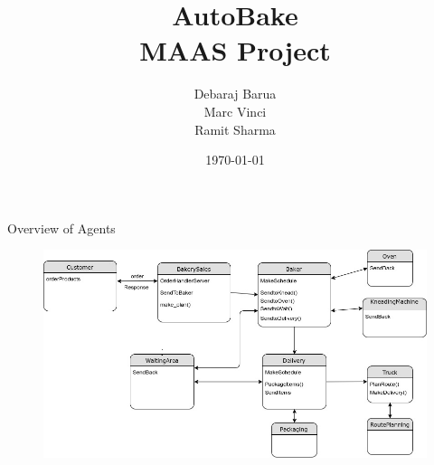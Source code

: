 \documentclass{beamer}
\author{Debaraj Barua\\Marc Vinci\\Ramit Sharma}
\date{\today}
\begin{document}
\title{%
		AutoBake\\
		\large MAAS Project
	   	}
	\maketitle
	
	
\begin{frame}{Overview of Agents}
\begin{figure}
	\includegraphics[scale=0.3]{ClassDiagram.jpg}
\end{figure}
\end{frame}
\end{document}
